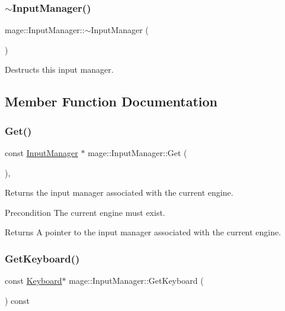 \subsubsection{\texorpdfstring{$\sim$\+Input\+Manager()}{~InputManager()}}
{\footnotesize\ttfamily mage\+::\+Input\+Manager\+::$\sim$\+Input\+Manager (\begin{DoxyParamCaption}{ }\end{DoxyParamCaption})\hspace{0.3cm}{\ttfamily [default]}}

Destructs this input manager. 

\subsection{Member Function Documentation}
\hypertarget{classmage_1_1_input_manager_a793d1172963fadb3c89f4d291020493d}{}\label{classmage_1_1_input_manager_a793d1172963fadb3c89f4d291020493d} 
\subsubsection{\texorpdfstring{Get()}{Get()}}
{\footnotesize\ttfamily const \hyperlink{classmage_1_1_input_manager}{Input\+Manager} $\ast$ mage\+::\+Input\+Manager\+::\+Get (\begin{DoxyParamCaption}{ }\end{DoxyParamCaption})\hspace{0.3cm}{\ttfamily [static]}, {\ttfamily [noexcept]}}

Returns the input manager associated with the current engine.

\begin{DoxyPrecond}{Precondition}
The current engine must exist. 
\end{DoxyPrecond}
\begin{DoxyReturn}{Returns}
A pointer to the input manager associated with the current engine. 
\end{DoxyReturn}
\hypertarget{classmage_1_1_input_manager_a2ceb6e20c122f7029cb75b970a11d58d}{}\label{classmage_1_1_input_manager_a2ceb6e20c122f7029cb75b970a11d58d} 
\subsubsection{\texorpdfstring{Get\+Keyboard()}{GetKeyboard()}}
{\footnotesize\ttfamily const \hyperlink{classmage_1_1_keyboard}{Keyboard}$\ast$ mage\+::\+Input\+Manager\+::\+Get\+Keyboard (\begin{DoxyParamCaption}{ }\end{DoxyParamCaption}) const\hspace{0.3cm}{\ttfamily [noexcept]}}

